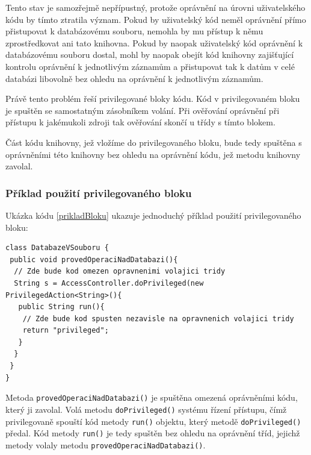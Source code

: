 Tento stav je samozřejmě nepřípustný, protože oprávnění na úrovni uživatelského kódu by tímto ztratila význam. Pokud by uživatelský kód neměl oprávnění přímo přistupovat k databázovému souboru, nemohla by mu přístup k němu zprostředkovat ani tato knihovna. Pokud by naopak uživatelský kód oprávnění k databázovému souboru dostal, mohl by naopak obejít kód knihovny zajišťující kontrolu oprávnění k jednotlivým záznamům a přistupovat tak k datům v celé databázi libovolně bez ohledu na oprávnění k jednotlivým záznamům.

Právě tento problém řeší privilegované bloky kódu. Kód v privilegovaném bloku je spuštěn se samostatným zásobníkem volání. Při ověřování oprávnění při přístupu k jakémukoli zdroji tak ověřování skončí u třídy s tímto blokem. \cite{refAccessController}

Část kódu knihovny, jež vložíme do privilegovaného bloku, bude tedy spuštěna s oprávněními této knihovny bez ohledu na oprávnění kódu, jež metodu knihovny zavolal.

\subsubsection{Příklad použití privilegovaného bloku}

Ukázka kódu \ref{prikladBloku} ukazuje jednoduchý příklad použití privilegovaného bloku: \cite{refAccessController}

\begin{lstlisting}[caption=Příklad použití privilegovaného bloku, label=prikladBloku]
class DatabazeVSouboru {
 public void provedOperaciNadDatabazi(){
  // Zde bude kod omezen opravnenimi volajici tridy
  String s = AccessController.doPrivileged(new PrivilegedAction<String>(){
   public String run(){
    // Zde bude kod spusten nezavisle na opravnenich volajici tridy
    return "privileged";
   }
  }
 }
}
\end{lstlisting}

Metoda {\tt provedOperaciNadDatabazi()} je spuštěna omezená oprávněními kódu, který ji zavolal.
Volá metodu {\tt doPrivileged()} systému řízení přístupu, čímž privilegovaně spouští kód metody {\tt run()} objektu, který metodě {\tt doPrivileged()} předal.
Kód metody {\tt run()} je tedy spuštěn bez ohledu na oprávnění tříd, jejichž metody volaly metodu {\tt provedOperaciNadDatabazi()}.

